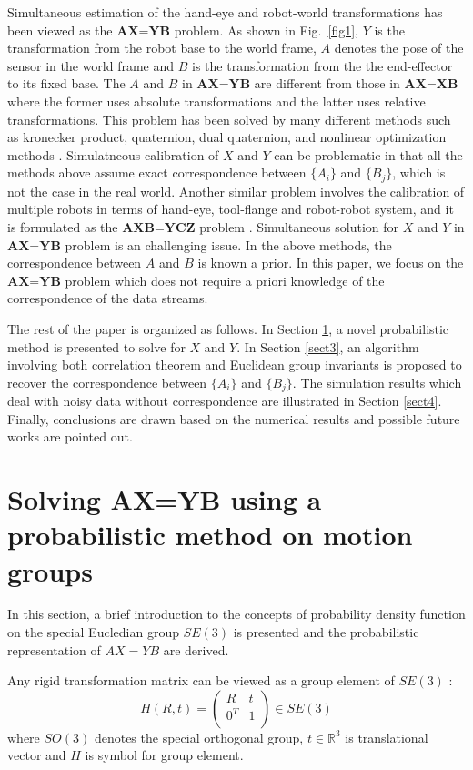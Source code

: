 \documentclass[letterpaper, 10 pt, conference]{ieeeconf}  %
\begin{document}
Simultaneous estimation of the hand-eye and robot-world transformations has been viewed as the $\textbf{AX=YB}$ problem. As shown in Fig.~\ref{fig1}, $Y$ is the transformation from the robot base to the world frame, $A$ denotes the pose of the sensor in the world frame and $B$ is the transformation from the the end-effector to its fixed base. The $A$ and $B$ in $\textbf{AX=YB}$ are different from those in $\textbf{AX=XB}$ where the former uses absolute transformations and the latter uses relative transformations. This problem has been solved by many different methods such as kronecker product, quaternion, dual quaternion, and nonlinear optimization methods \cite{Zhuang1994,dornaika1998simultaneous,Hirsh2001, ernst2012non,strobl2006optimal,Li2010,Shah2013,Heller2014}. Simulatneous calibration of $X$ and $Y$ can be problematic in that all the methods above assume exact correspondence between $\{A_i\}$ and $\{B_j\}$, which is not the case in the real world. Another similar problem involves the calibration of multiple robots in terms of hand-eye, tool-flange and robot-robot system, and it is formulated as the $\textbf{AXB=YCZ}$ problem \cite{Wang2014}. Simultaneous solution for $X$ and $Y$ in $\textbf{AX=YB}$ problem is an challenging issue. In the above methods, the correspondence between $A$ and $B$ is known a prior. In this paper, we focus on the $\textbf{AX=YB}$ problem which does not require a priori knowledge of the correspondence of the data streams.

The rest of the paper is organized as follows. In Section
\ref{sect2}, a novel probabilistic method is presented to solve for $X$ and $Y$. In Section \ref{sect3}, an algorithm involving both correlation theorem and Euclidean group invariants is proposed to recover the correspondence between $\{A_i\}$ and $\{B_j\}$. The simulation results which deal with noisy data without correspondence are illustrated in Section \ref{sect4}. Finally, conclusions are drawn based on the numerical results and possible future works are pointed out.

\section{Solving AX=YB using a probabilistic method on motion groups}
\label{sect2}
In this section, a brief introduction to the concepts of probability density function on the special Eucledian group $SE(3)$ is presented and the probabilistic representation of $AX=YB$ are derived.  

Any rigid transformation matrix can be viewed as a group element of $SE(3)$ :
\begin{equation}\label{equ0}
    H(R,t)=\left(
             \begin{array}{cc}
               R & t \\
               0^{T} & 1 \\
             \end{array}
           \right) \in SE(3)
\end{equation}
where $SO(3)$ denotes the special orthogonal group, $t \in \mathbb{R}^3 $ is translational vector and $H$ is symbol for group element. 
\end{document}
